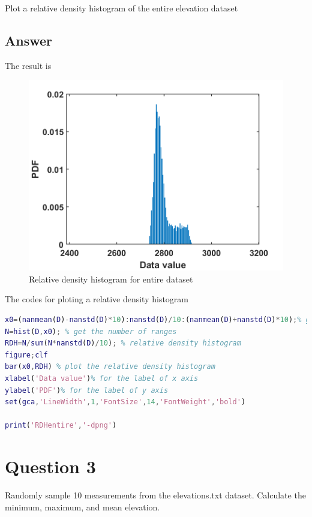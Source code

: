 \documentclass[
	12pt, %
]{fphw}
\begin{document}
\begin{problem}
Plot a relative density histogram of the entire elevation dataset
	
\end{problem}


\subsection*{Answer}

The result is

\begin{figure}[htbp]
	\centering
	\includegraphics[width=0.35\columnwidth]{RDHentire.png} 
	\caption{Relative density histogram for entire dataset}
\end{figure}

The codes for ploting a relative density histogram
\begin{lstlisting}[language=Matlab,escapeinside=``]
x0=(nanmean(D)-nanstd(D)*10):nanstd(D)/10:(nanmean(D)+nanstd(D)*10);% give the central points
N=hist(D,x0); % get the number of ranges
RDH=N/sum(N*nanstd(D)/10); % relative density histogram
figure;clf
bar(x0,RDH) % plot the relative density histogram
xlabel('Data value')% for the label of x axis
ylabel('PDF')% for the label of y axis
set(gca,'LineWidth',1,'FontSize',14,'FontWeight','bold')

print('RDHentire','-dpng')
\end{lstlisting}



\section*{Question 3}

\begin{problem}
 Randomly sample 10 measurements from the elevations.txt dataset. Calculate the minimum, maximum, and mean elevation.
\end{problem}
\end{document}
